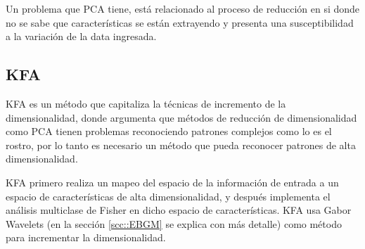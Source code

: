 

Un problema que \ac{PCA} tiene, está relacionado al proceso de reducción en si donde no se sabe que características se están extrayendo y presenta una susceptibilidad a la variación de la data ingresada.

\subsection{\ac{KFA}}
\ac{KFA} \cite{liu2006capitalize} es un método que capitaliza la técnicas de incremento de la dimensionalidad, donde argumenta que métodos de reducción de dimensionalidad como \ac{PCA} tienen problemas reconociendo patrones complejos como lo es el rostro, por lo tanto es necesario un método que pueda reconocer patrones de alta dimensionalidad.

\ac{KFA} primero realiza un mapeo del espacio de la información de entrada a un espacio de características de alta dimensionalidad, y después implementa el análisis multiclase de Fisher en dicho espacio de características. \ac{KFA} usa Gabor Wavelets (en la sección \ref{scc::EBGM} se explica con más detalle) como método para incrementar la dimensionalidad.


